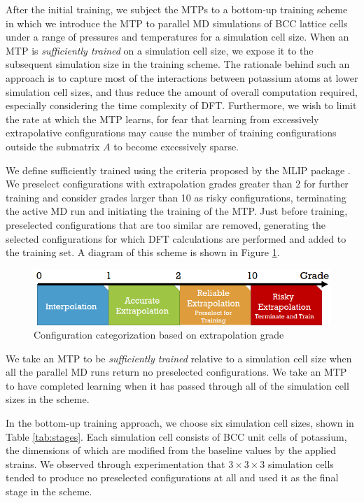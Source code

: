 \documentclass[9pt,twocolumn,twoside]{opticajnl}
\begin{document}
After the initial training, we subject the MTPs to a bottom-up training scheme in which we introduce the MTP to parallel MD simulations of BCC lattice cells under a range of pressures and temperatures for a simulation cell size. When an MTP is \textit{sufficiently trained} on a simulation cell size, we expose it to the subsequent simulation size in the training scheme. The rationale behind such an approach is to capture most of the interactions between potassium atoms at lower simulation cell sizes, and thus reduce the amount of overall computation required, especially considering the time complexity of DFT.  Furthermore, we wish to limit the rate at which the MTP learns, for fear that learning from excessively extrapolative configurations may cause the number of training configurations outside the submatrix $A$ to become excessively sparse. 

  We define \textit{}{sufficiently trained} using the criteria proposed by the MLIP package \cite{mlip}. We preselect configurations with extrapolation grades greater than 2 for further training and consider grades larger than 10 as risky configurations, terminating the active MD run and initiating the training of the MTP. Just before training, preselected configurations that are too similar are removed, generating the selected configurations for which DFT calculations are performed and added to the training set. A diagram of this scheme is shown in Figure \ref{fig:extrapolation}.

  \begin{figure}[ht]
    \centering
    \includegraphics[width=\linewidth]{assets/grade.png}
    \caption{Configuration categorization based on extrapolation grade}
    \label{fig:extrapolation}
  \end{figure}

  We take an MTP to be \textit{sufficiently trained} relative to a simulation cell size when all the parallel MD runs return no preselected configurations. We take an MTP to have completed learning when it has passed through all of the simulation cell sizes in the scheme.

  In the bottom-up training approach, we choose six simulation cell sizes, shown in Table \ref{tab:stages}. Each simulation cell consists of BCC unit cells of potassium, the dimensions of which are modified from the baseline values by the applied strains. We observed through experimentation that $3\times 3\times 3$ simulation cells tended to produce no preselected configurations at all and used it as the final stage in the scheme.
\end{document}
